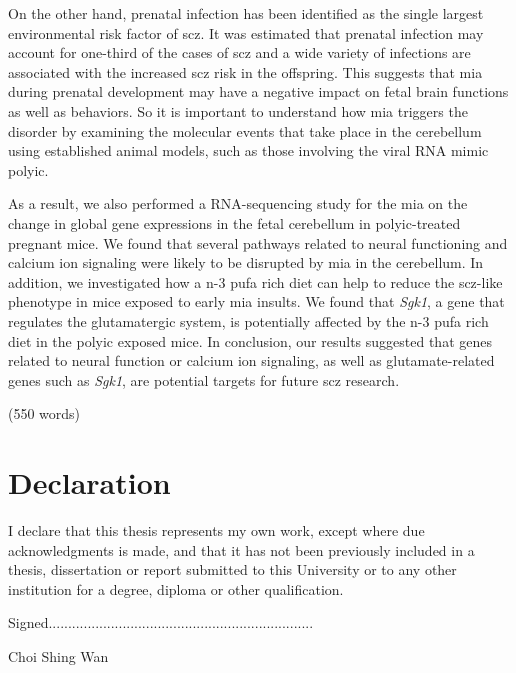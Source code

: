 \documentclass[12pt]{scrbook}
\begin{document}
	On the other hand, prenatal infection has been identified as the single largest environmental risk factor of \gls{scz}. 
	It was estimated that prenatal infection may account for one-third of the cases of \gls{scz} and a wide variety of infections are associated with the increased \gls{scz} risk in the offspring. 
	This suggests that \gls{mia} during prenatal development may have a negative impact on fetal brain functions as well as behaviors.
	So it is important to understand how \gls{mia} triggers the disorder by examining the molecular events that take place in the cerebellum using established animal models, such as those involving the viral RNA mimic \gls{polyic}.
	
	As a result, we also performed a RNA-sequencing study for the \gls{mia} on the change in global gene expressions in the fetal cerebellum in \gls{polyic}-treated pregnant mice.
	We found that several pathways related to neural functioning and calcium ion signaling were likely to be disrupted by \gls{mia} in the cerebellum. 
	In addition, we investigated how a n-3 \gls{pufa} rich diet can help to reduce the \gls{scz}-like phenotype in mice exposed to early \gls{mia} insults.
	We found that \textit{Sgk1}, a gene that regulates the glutamatergic system, is potentially affected by the n-3 \gls{pufa} rich diet in the \gls{polyic} exposed mice. 
	In conclusion, our results suggested that genes related to neural function or calcium ion signaling, as well as glutamate-related genes such as \textit{Sgk1}, are potential targets for future \gls{scz} research.
	
	\begin{flushright}
		(550 words)
	\end{flushright}
	\glsresetall
	\cleardoublepage
	\chapter*{Declaration}
	\vspace{1cm}
	I declare that this thesis represents my own work, except where due acknowledgments	is made, and that it has not been previously included in a thesis, dissertation or report submitted to this University or to any other institution for a degree, diploma or other qualification.
	\vspace{1.5cm}
	
	\centerline{Signed....................................................................}
	\centerline{Choi Shing Wan}
	\restoregeometry
	\cleardoublepage
\end{document}
